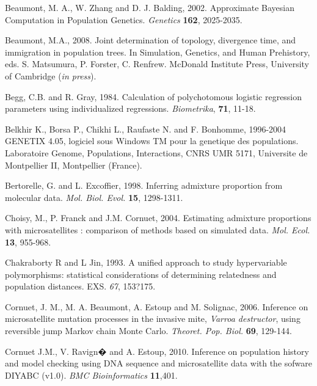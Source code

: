 \begin{thebibliography}{a}

 Beaumont, M. A., W.
Zhang and D. J. Balding, 2002. Approximate Bayesian Computation in
Population Genetics. \emph{Genetics} \textbf{162}, 2025-2035.

Beaumont, M.A., 2008. Joint determination
of topology, divergence time, and immigration in population trees.
In Simulation, Genetics, and Human Prehistory, eds. S. Matsumura,
P. Forster, C. Renfrew. McDonald Institute Press, University of Cambridge
(\emph{in press}).

 Begg, C.B. and R. Gray, 1984.
Calculation of polychotomous logistic regression parameters using
individualized regressions. \emph{Biometrika}, \textbf{71}, 11-18.

 Belkhir K., Borsa
P., Chikhi L., Raufaste N. and F. Bonhomme, 1996-2004 GENETIX 4.05,
logiciel sous Windows TM pour la genetique des populations. Laboratoire
Genome, Populations, Interactions, CNRS UMR 5171, Universite de Montpellier
II, Montpellier (France).

 Bertorelle, G. and
L. Excoffier, 1998. Inferring admixture proportion from molecular
data. \emph{Mol. Biol. Evol.} \textbf{15}, 1298-1311.

 Choisy, M., P. Franck
and J.M. Cornuet, 2004. Estimating admixture proportions with microsatellites
: comparison of methods based on simulated data. \emph{Mol. Ecol.}
\textbf{13}, 955-968.

Chakraborty R and L Jin,
1993. A unified approach to study hypervariable polymorphisms: statistical
considerations of determining relatedness and population distances.
EXS. \emph{67}, 153?175.

 Cornuet, J. M., M. A.
Beaumont, A. Estoup and M. Solignac, 2006. Inference on microsatellite
mutation processes in the invasive mite, \emph{Varroa destructor},
using reversible jump Markov chain Monte Carlo. \emph{Theoret. Pop.
Biol.} \textbf{69}, 129-144.

Cornuet J.M., V. Ravign�
and A. Estoup, 2010. Inference on population history and model checking
using DNA sequence and microsatellite data with the sofware DIYABC
(v1.0). \emph{BMC Bioinformatics} \textbf{11},401.


\end{thebibliography}
